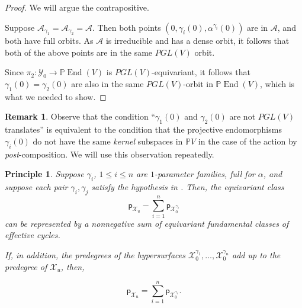 \documentclass[12 pt, reqno]{amsart}
\newtheorem{prin}[thm]{Principle}
\theoremstyle{definition}
\newtheorem{rmk}[thm]{Remark}
\newcommand{\on}{\operatorname}
\newcommand{\mb}{\mathbb}
\renewcommand{\P}{\mb{P}}
\newcommand{\p}{\mathsf{p}}
\begin{document}
\begin{proof}
  We will argue the contrapositive.
  
  
  Suppose
  $\mathcal{A}_{\gamma_{1}} = \mathcal{A}_{\gamma_{2}} = \mathcal{A}$.
  Then both points $(0,\gamma_{i}(0), \alpha^{\gamma_{i}}(0))$ are in
  $\mathcal{A}$, and both have full orbits.  As $\mathcal{A}$ is
  irreducible and has a dense orbit, it follows that both of the above
  points are in the same $PGL(V)$ orbit.

  
  Since $\pi_{2}: \mathcal{Y}_{0} \to \P \on{End}(V)$ is
  $PGL(V)$-equivariant, it follows that
  $ \gamma_{1}(0) = \gamma_{2}(0)$ are also in the same $PGL(V)$-orbit
  in $\P \on{End}(V)$, which is what we needed to show.
\end{proof}

\begin{rmk}
  \label{imageskernels}
  Observe that the condition ``$\gamma_{1}(0)$ and $\gamma_{2}(0)$ are
  not $PGL(V)$ translates'' is equivalent to the condition that the
  projective endomorphisms $\gamma_{i}(0)$ do not have the same {\sl
    kernel} subspaces in $\P V$ in the case of the action by {\sl
    post}-composition.  We will use this observation repeatedly.
\end{rmk}



\begin{prin}
  \label{principle}
  Suppose $\gamma_{i}$, $1\leq i\leq n$ are $1$-parameter families,
  full for $\alpha$, and suppose each pair $\gamma_{i},\gamma_{j}$
  satisfy the hypothesis in .  Then, the equivariant
  class
  \[\p_{\mathcal{X}_{u}}-\sum_{i=1}^{n}\p_{\mathcal{X}^{\gamma_{i}}_{0}}\]
  can be represented by a nonnegative sum of equivariant fundamental
  classes of effective cycles.

  If, in addition, the predegrees of the hypersurfaces
  $\mathcal{X}^{\gamma_{1}}_{0},\ldots,\mathcal{X}^{\gamma_{n}}_0$ add
  up to the predegree of $\mathcal{X}_{u}$, then,

  \[\p_{\mathcal{X}_u}=\sum_{i=1}^{n}\p_{\mathcal{X}^{\gamma_{i}}_{0}}.\]
\end{prin}
\end{document}
